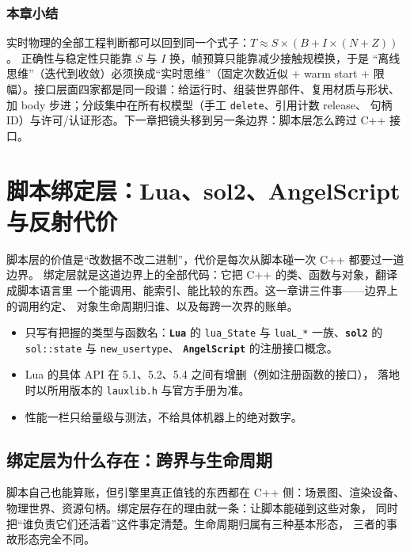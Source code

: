 \documentclass[12pt,a4paper,fontset=fandol]{ctexbook}
\newcommand{\Tp}[1]{\texttt{#1}}
\newcommand{\Lib}[1]{\textbf{\texttt{#1}}}
\begin{document}
\subsection*{本章小结}
实时物理的全部工程判断都可以回到同一个式子：$T \approx S \times (B + I \times (N + Z))$。
正确性与稳定性只能靠 $S$ 与 $I$ 换，帧预算只能靠减少接触规模换，于是
``离线思维''（迭代到收敛）必须换成``实时思维''（固定次数近似 + warm start +
限幅）。接口层面四家都是同一段谱：给运行时、组装世界部件、复用材质与形状、
加 body 步进；分歧集中在所有权模型（手工 \Tp{delete}、引用计数 release、
句柄 ID）与许可/认证形态。下一章把镜头移到另一条边界：脚本层怎么跨过 C++ 接口。

\chapter{脚本绑定层：Lua、sol2、AngelScript 与反射代价}
\label{ch:ch14-binding}

脚本层的价值是``改数据不改二进制''，代价是每次从脚本碰一次 C++ 都要过一道边界。
绑定层就是这道边界上的全部代码：它把 C++ 的类、函数与对象，翻译成脚本语言里
一个能调用、能索引、能比较的东西。这一章讲三件事——边界上的调用约定、
对象生命周期归谁、以及每跨一次界的账单。

\begin{guideline}[title={本章口径}]
\begin{itemize}
  \item 只写有把握的类型与函数名：\Lib{Lua} 的 \Tp{lua\_State} 与 \Tp{luaL\_*}
        一族、\Lib{sol2} 的 \Tp{sol::state} 与 \Tp{new\_usertype}、
        \Lib{AngelScript} 的注册接口概念。
  \item Lua 的具体 API 在 5.1、5.2、5.4 之间有增删（例如注册函数的接口），
        落地时以所用版本的 \Tp{lauxlib.h} 与官方手册为准。
  \item 性能一栏只给量级与测法，不给具体机器上的绝对数字。
\end{itemize}
\end{guideline}

\section{绑定层为什么存在：跨界与生命周期}
\label{sec:ch14-why}

脚本自己也能算账，但引擎里真正值钱的东西都在 C++ 侧：场景图、渲染设备、
物理世界、资源句柄。绑定层存在的理由就一条：让脚本能碰到这些对象，
同时把``谁负责它们还活着''这件事定清楚。生命周期归属有三种基本形态，
三者的事故形态完全不同。
\end{document}
